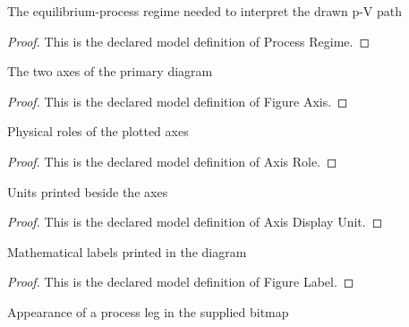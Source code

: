 \begin{definition}
  \label{def:physics:phyx-mini-0344:phyxminiproblems-problemphyxmini0344-processregime}
  The equilibrium-process regime needed to interpret the drawn p-V path
\end{definition}
\begin{proof}
  This is the declared model definition of Process Regime.
\end{proof}
\begin{definition}
  \label{def:physics:phyx-mini-0344:phyxminiproblems-problemphyxmini0344-figureaxis}
  The two axes of the primary diagram
\end{definition}
\begin{proof}
  This is the declared model definition of Figure Axis.
\end{proof}
\begin{definition}
  \label{def:physics:phyx-mini-0344:phyxminiproblems-problemphyxmini0344-axisrole}
  Physical roles of the plotted axes
\end{definition}
\begin{proof}
  This is the declared model definition of Axis Role.
\end{proof}
\begin{definition}
  \label{def:physics:phyx-mini-0344:phyxminiproblems-problemphyxmini0344-axisdisplayunit}
  Units printed beside the axes
\end{definition}
\begin{proof}
  This is the declared model definition of Axis Display Unit.
\end{proof}
\begin{definition}
  \label{def:physics:phyx-mini-0344:phyxminiproblems-problemphyxmini0344-figurelabel}
  Mathematical labels printed in the diagram
\end{definition}
\begin{proof}
  This is the declared model definition of Figure Label.
\end{proof}
\begin{definition}
  \label{def:physics:phyx-mini-0344:phyxminiproblems-problemphyxmini0344-legstyle}
  Appearance of a process leg in the supplied bitmap
\end{definition}

